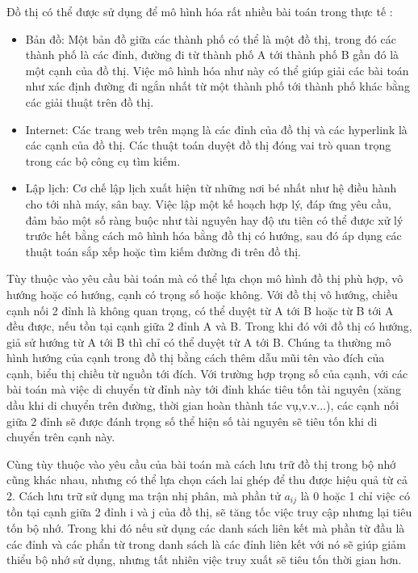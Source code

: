 \documentclass{hust}
\begin{document}
Đồ thị có thể được sử dụng để mô hình hóa rất nhiều bài toán trong thực tế \cite{sedgewick2011algorithms}:
\begin{itemize}
	\item Bản đồ: Một bản đồ giữa các thành phố có thể là một đồ thị, trong đó các thành phố là các đỉnh, đường đi từ thành phố A tới thành phố B gần đó là một cạnh của đồ thị. Việc mô hình hóa như này có thể giúp giải các bài toán như xác định đường đi ngắn nhất từ một thành phố tới thành phố khác bằng các giải thuật trên đồ thị.
	\item Internet: Các trang web trên mạng là các đỉnh của đồ thị và các hyperlink là các cạnh của đồ thị. Các thuật toán duyệt đồ thị đóng vai trò quan trọng trong các bộ công cụ tìm kiếm.
	\item Lập lịch: Cơ chế lập lịch xuất hiện từ những nơi bé nhất như hệ điều hành cho tới nhà máy, sân bay. Việc lập một kế hoạch hợp lý, đáp ứng yêu cầu, đảm bảo một số ràng buộc như tài nguyên hay độ ưu tiên có thể được xử lý trước hết bằng cách mô hình hóa bằng đồ thị có hướng, sau đó áp dụng các thuật toán sắp xếp hoặc tìm kiếm đường đi trên đồ thị.
\end{itemize}
Tùy thuộc vào yêu cầu bài toán mà có thể lựa chọn mô hình đồ thị phù hợp, vô hướng hoặc có hướng, cạnh có trọng số hoặc không. Với đồ thị vô hướng, chiều cạnh nối 2 đỉnh là không quan trọng, có thể duyệt từ A tới B hoặc từ B tới A đều được, nếu tồn tại cạnh giữa 2 đỉnh A và B. Trong khi đó với đồ thị có hướng, giả sử hướng từ A tới B thì chỉ có thể duyệt từ A tới B. Chúng ta thường mô hình hướng của cạnh trong đồ thị bằng cách thêm dẫu mũi tên vào đích của cạnh, biểu thị chiều từ nguồn tới đích. Với trường hợp trọng số của cạnh, với các bài toán mà việc di chuyển từ đỉnh này tới đỉnh khác tiêu tốn tài nguyên (xăng dầu khi di chuyển trên đường, thời gian hoàn thành tác vụ,v.v...), các cạnh nối giữa 2 đỉnh sẽ được đánh trọng số thể hiện số tài nguyên sẽ tiêu tốn khi di chuyển trên cạnh này.


Cùng tùy thuộc vào yêu cầu của bài toán mà cách lưu trữ đồ thị trong bộ nhớ cũng khác nhau, nhưng có thể lựa chọn cách lai ghép để thu được hiệu quả từ cả 2. Cách lưu trữ sử dụng ma trận nhị phân, mà phần tử $a_{ij}$ là 0 hoặc 1 chỉ việc có tồn tại cạnh giữa 2 đỉnh i và j của đồ thị, sẽ tăng tốc việc truy cập nhưng lại tiêu tốn bộ nhớ. Trong khi đó nếu sử dụng các danh sách liên kết mà phần từ đầu là các đỉnh và các phẩn từ trong danh sách là các đỉnh liên kết với nó sẽ giúp giảm thiểu bộ nhớ sử dụng, nhưng tất nhiên việc truy xuất sẽ tiêu tốn thời gian hơn.
\end{document}
